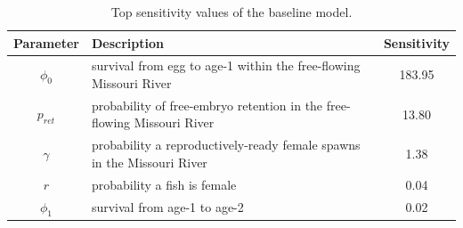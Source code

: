 \documentclass[12pt]{article}
\begin{document}
\newpage

\begin{table}[h]
\caption{Top sensitivity values of the baseline model.}
\centering
\begin{tabular}{cp{5.5cm}c}
\hline
Parameter & \hspace{1.8cm} Description & Sensitivity\\ 
\hline
$\phi_0$ & survival from egg to age-1 within the free-flowing Missouri River \newline & 183.95\\
$p_{ret}$ & probability of free-embryo retention in the free-flowing Missouri River \newline & 13.80\\
$\gamma$ & probability a reproductively-ready female spawns in the Missouri River \newline & 1.38\\
$r$ & probability a fish is female \newline & 0.04\\ 
$\phi_1$ & survival from age-1 to age-2 \newline & 0.02\\
\hline
\end{tabular}
\end{table}
\end{document}

